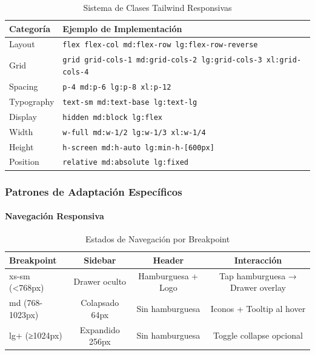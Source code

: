 \documentclass[12pt,a4paper,oneside]{article}
\begin{document}
\begin{table}[h]
\centering
\caption{Sistema de Clases Tailwind Responsivas}
\label{tab:tailwind-responsive}
\small
\begin{tabular}{|l|p{9cm}|}
\hline
\textbf{Categoría} & \textbf{Ejemplo de Implementación} \\
\hline
Layout & \texttt{flex flex-col md:flex-row lg:flex-row-reverse} \\
\hline
Grid & \texttt{grid grid-cols-1 md:grid-cols-2 lg:grid-cols-3 xl:grid-cols-4} \\
\hline
Spacing & \texttt{p-4 md:p-6 lg:p-8 xl:p-12} \\
\hline
Typography & \texttt{text-sm md:text-base lg:text-lg} \\
\hline
Display & \texttt{hidden md:block lg:flex} \\
\hline
Width & \texttt{w-full md:w-1/2 lg:w-1/3 xl:w-1/4} \\
\hline
Height & \texttt{h-screen md:h-auto lg:min-h-[600px]} \\
\hline
Position & \texttt{relative md:absolute lg:fixed} \\
\hline
\end{tabular}
\end{table}

\subsubsection{Patrones de Adaptación Específicos}

\paragraph{Navegación Responsiva}

\begin{table}[h]
\centering
\caption{Estados de Navegación por Breakpoint}
\label{tab:nav-responsive}
\small
\begin{tabular}{|l|c|c|c|}
\hline
\textbf{Breakpoint} & \textbf{Sidebar} & \textbf{Header} & \textbf{Interacción} \\
\hline
xs-sm (<768px) & Drawer oculto & Hamburguesa + Logo & Tap hamburguesa → Drawer overlay \\
\hline
md (768-1023px) & Colapsado 64px & Sin hamburguesa & Iconos + Tooltip al hover \\
\hline
lg+ (≥1024px) & Expandido 256px & Sin hamburguesa & Toggle collapse opcional \\
\hline
\end{tabular}
\end{table}
\end{document}
